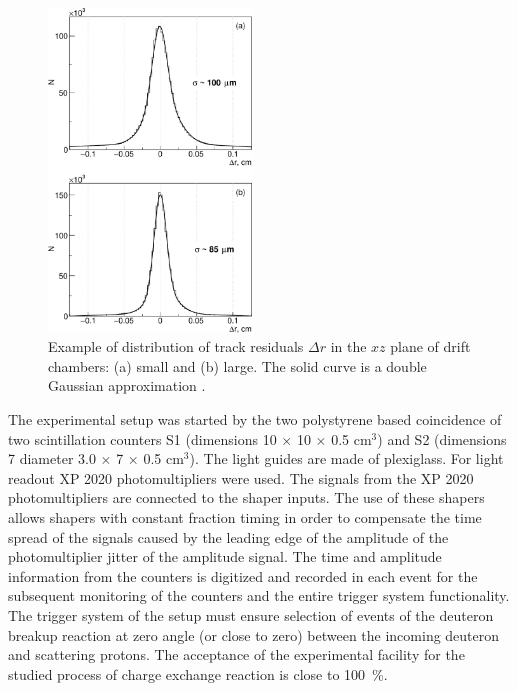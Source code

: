 \documentclass[twocolumn,epjc3]{svjour3}
\providecommand{\DIFaddtex}[1]{{\protect\color{Green} \sf #1}} %
\providecommand{\DIFdeltex}[1]{{\protect\color{Red} \scriptsize #1}} %
\providecommand{\DIFaddbegin}{} %
\providecommand{\DIFaddend}{} %
\providecommand{\DIFdelbegin}{} %
\providecommand{\DIFdelend}{} %
\providecommand{\DIFaddFL}[1]{\DIFadd{#1}} %
\providecommand{\DIFaddbeginFL}{} %
\providecommand{\DIFaddendFL}{} %
\providecommand{\DIFdelendFL}{} %
\providecommand{\DIFadd}[1]{\texorpdfstring{\DIFaddtex{#1}}{#1}} %
\providecommand{\DIFdel}[1]{\texorpdfstring{\DIFdeltex{#1}}{}} %
\newcommand{\DIFscaledelfig}{0.5}
\newlength{\DIFdelgraphicswidth} %
\newlength{\DIFdelgraphicsheight} %
\newcommand{\DIFaddincludegraphics}[2][]{{\color{blue}\fbox{\DIFOincludegraphics[#1]{#2}}}} %
\newcommand{\DIFdelincludegraphics}[2][]{%
\sbox{\DIFdelgraphicsbox}{\DIFOincludegraphics[#1]{#2}}%
\settoboxwidth{\DIFdelgraphicswidth}{\DIFdelgraphicsbox} %
\settoboxtotalheight{\DIFdelgraphicsheight}{\DIFdelgraphicsbox} %
\scalebox{\DIFscaledelfig}{%
\parbox[b]{\DIFdelgraphicswidth}{\usebox{\DIFdelgraphicsbox}\\[-\baselineskip] \rule{\DIFdelgraphicswidth}{0em}}\llap{\resizebox{\DIFdelgraphicswidth}{\DIFdelgraphicsheight}{%
\setlength{\unitlength}{\DIFdelgraphicswidth}%
\begin{picture}(1,1)%
\thicklines\linethickness{2pt} %
{\color[rgb]{1,0,0}\put(0,0){\framebox(1,1){}}}%
{\color[rgb]{1,0,0}\put(0,0){\line( 1,1){1}}}%
{\color[rgb]{1,0,0}\put(0,1){\line(1,-1){1}}}%
\end{picture}%
}\hspace*{3pt}}} %
} %
\DeclareRobustCommand{\DIFaddbegin}{\DIFOaddbegin \let\includegraphics\DIFaddincludegraphics} %
\DeclareRobustCommand{\DIFaddend}{\DIFOaddend \let\includegraphics\DIFOincludegraphics} %
\DeclareRobustCommand{\DIFdelbegin}{\DIFOdelbegin \let\includegraphics\DIFdelincludegraphics} %
\DeclareRobustCommand{\DIFdelend}{\DIFOaddend \let\includegraphics\DIFOincludegraphics} %
\DeclareRobustCommand{\DIFaddbeginFL}{\DIFOaddbeginFL \let\includegraphics\DIFaddincludegraphics} %
\DeclareRobustCommand{\DIFaddendFL}{\DIFOaddendFL \let\includegraphics\DIFOincludegraphics} %
\DeclareRobustCommand{\DIFdelendFL}{\DIFOaddendFL \let\includegraphics\DIFOincludegraphics} %
\begin{document}
\DIFdelbegin %
\DIFdelendFL \DIFaddbeginFL \begin{figure}[t]
  \DIFaddendFL \centering
  \includegraphics[width=0.48\textwidth]{res_chambers.pdf}
  \caption{Example of distribution of track residuals $\Delta r$ in the $xz$
    plane of drift chambers: (a) small and (b) large. The solid curve is a
    double Gaussian approximation \DIFaddbeginFL \DIFaddFL{\cite{gla13}}\DIFaddendFL .}
  \label{fig:res_chambers}
\end{figure}

The experimental setup was started by \DIFdelbegin \DIFdel{the two polysty\-rene based }\DIFdelend \DIFaddbegin \DIFadd{coincidence of two }\DIFaddend scintillation counters
S1 (dimensions \DIFdelbegin \DIFdel{10 }\DIFdelend \DIFaddbegin \DIFadd{7.5 }\DIFaddend $\times$ \DIFdelbegin \DIFdel{10 }\DIFdelend \DIFaddbegin \DIFadd{7.5 }\DIFaddend $\times$ 0.5 cm$^3$) and S2 (dimensions \DIFdelbegin \DIFdel{7
}\DIFdelend \DIFaddbegin \DIFadd{diameter
3.0 }\DIFaddend $\times$ \DIFdelbegin \DIFdel{7 $\times$ 0.5 }\DIFdelend \DIFaddbegin \DIFadd{0.2 }\DIFaddend cm$^3$). The \DIFdelbegin \DIFdel{light guides are made of plexiglass. For
light readout XP 2020 photomultipliers were used. The }\DIFdelend signals from the \DIFaddbegin \DIFadd{XP 2020 }\DIFaddend photomultipliers are
connected to the \DIFdelbegin \DIFdel{shaper inputs. The use of these shapers allows }\DIFdelend \DIFaddbegin \DIFadd{shapers with constant fraction timing in order }\DIFaddend to compensate
the time \DIFdelbegin \DIFdel{spread of the signals caused by the leading edge
of the amplitude of the photomultiplier }\DIFdelend \DIFaddbegin \DIFadd{jitter of the amplitude }\DIFaddend signal. The time and amplitude information from
the counters is digitized and recorded in each event for the subsequent
monitoring of the counters and the entire trigger system functionality.
\DIFdelbegin \DIFdel{The trigger system of the setup must ensure selection of events
of the deuteron breakup reaction at zero angle (or close to zero) between the
incoming deuteron and scattering protons. The acceptance of the experimental
facility for the studied process of charge exchange reaction is close to 100~\%.
}\DIFdelend 
\end{document}
